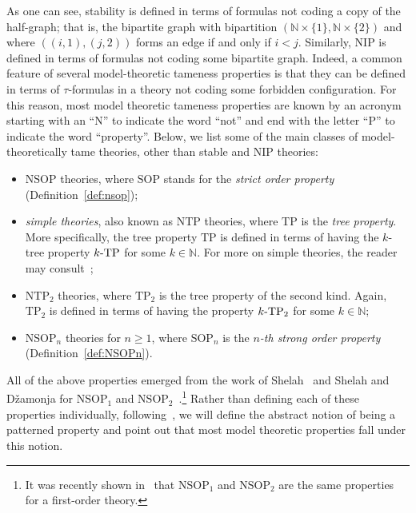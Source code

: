 \documentclass{amsart}
\theoremstyle{definition}
\theoremstyle{remark}
\numberwithin{equation}{section}
\begin{document}
As one can see, stability is defined in terms of formulas not coding a copy of the half-graph; that is, the {bipartite graph with bipartition $(\mathbb{N}\times\{1\},\mathbb{N}\times\{2\})$} and where ${((i,1),(j,2))}$ forms an edge if and only if $i<j$. Similarly, $\mathrm{NIP}$ is defined in terms of formulas not coding some bipartite graph.
Indeed, a common feature of several model-theoretic tameness properties is that they can be defined in terms of $\tau$-formulas in a theory not coding some forbidden configuration. For this reason, most model theoretic tameness properties are known by an acronym starting with an ``N'' to indicate the word ``not'' and end with the letter ``P'' to indicate the word ``property''. Below, we list some of the main classes of model-theoretically tame theories, other than stable and $\mathrm{NIP}$ theories:
\begin{itemize}
    \item $\mathrm{NSOP}$ theories, where $\mathrm{SOP}$ stands for the \emph{strict order property} (Definition~\ref{def:nsop});
    \item \emph{simple theories}, also known as $\mathrm{NTP}$ theories, where $\mathrm{TP}$ is the \emph{tree property}. More specifically, the tree property $\mathrm{TP}$ is defined in terms of having the $k$-tree property $k\textnormal{-}\mathrm{TP}$ for some $k\in\mathbb{N}$. For more on simple theories, the reader may consult~\cite{wagner2000simple, kim2013simplicity};
    \item $\mathrm{NTP}_2$ theories, where $\mathrm{TP}_2$ is the tree property of the second kind. Again, $\mathrm{TP}_2$ is defined in terms of having the property $k\textnormal{-}\mathrm{TP}_2$ for some $k\in\mathbb{N}$; 
    \item $\mathrm{NSOP}_n$ theories for $n\geq 1$, where $\mathrm{SOP}_n$ is the \emph{$n$-th strong order property} (Definition~\ref{def:NSOPn}).
\end{itemize}
All of the above properties emerged from the work of Shelah~\cite{shelah1990classification, shelah1980simple, shelah1995toward} and Shelah and D{\v{z}}amonja for $\mathrm{NSOP}_1$ and $\mathrm{NSOP}_2$~\cite{dvzamonja2004maximality}.\footnote{It was recently shown in~\cite{mutchnik2025textup} that $\mathrm{NSOP}_1$ and $\mathrm{NSOP}_2$ are the same properties for a first-order theory.} Rather than defining each of these properties individually, following~\cite{bailetti2024walk}, we will define the abstract notion of being a patterned property and point out that most model theoretic properties fall under this notion. 
\end{document}
